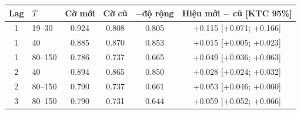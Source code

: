 \begin{tabular}{clcccc}
\toprule
Lag & $T$ & Cờ mới & Cờ cũ & $-$độ rộng & Hiệu mới $-$ cũ [KTC 95\%]\\
\midrule
1 & 19--30 & 0.924 & 0.808 & 0.805 & +0.115 [+0.071; +0.166] \\
1 & 40 & 0.885 & 0.870 & 0.853 & +0.015 [+0.005; +0.023] \\
1 & 80--150 & 0.786 & 0.737 & 0.665 & +0.049 [+0.036; +0.063] \\
2 & 40 & 0.894 & 0.865 & 0.850 & +0.028 [+0.024; +0.032] \\
2 & 80--150 & 0.790 & 0.737 & 0.661 & +0.053 [+0.046; +0.060] \\
3 & 80--150 & 0.790 & 0.731 & 0.644 & +0.059 [+0.052; +0.066] \\
\bottomrule
\end{tabular}
